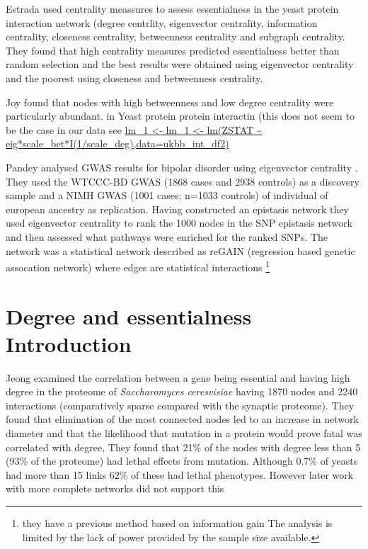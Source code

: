 Estrada \cite{estrada2006virtual} used centrality meassures to assess essentialness in the yeast protein interaction network (degree centrlity, eigenvector centrality, information centrality, closeness centrality, betweenness centrality and subgraph centrality. They found that high centrality measures predicted essentialness better than random selection and  the best results were obtained using eigenvector centrality and the poorest using closeness and betweenness centrality. 

Joy found that nodes with high betweenness and low degree centrality were particularly abundant.\cite{joy2005high} in Yeast protein protein interactin (this does not seem to be the case in our data see \url{lm_1 <- lm_1 <- lm(ZSTAT ~  eig*scale_bet*I(1/scale_deg),data=ukbb_int_df2)}

Pandey analysed GWAS results for bipolar disorder using eigenvector centrality \cite{pandey2012epistasis}. They used the WTCCC-BD GWAS (1868 cases and 2938 controls) as a discovery sample and  a NIMH GWAS (1001 cases; n=1033 controls) of individual of european ancestry as replication. Having constructed an epistasis network they used eigenvector centrality to rank the 1000 nodes in the SNP epistasis network and then assessed what pathways were enriched for the ranked SNPs. The network was a statistical network described as reGAIN (regression based genetic assocation network) where edges are statistical interactions \footnote{they have a previous method based on information gain The analysis is limited by the lack of power provided by the sample size available.}

\section{Degree and essentialness Introduction}
\label{sec:Degree and essentialness}
Jeong \cite{jeong2001lethality} examined the correlation between a gene being essential and having high degree in the proteome of \textit{Saccharomyces ceresvisiae} having 1870 nodes and 2240 interactions (comparatively sparse compared with the synaptic proteome). They found that elimination of the most connected nodes led to an increase in network diameter and that the likelihood that mutation in a protein would prove fatal was correlated with degree, They found that 21\% of the nodes with degree less than 5 (93\% of the proteome) had lethal effects from mutation. Although 0.7\% of yeasts had more than 15 links  62\% of these had lethal phenotypes. However later work with more complete networks did not support this \cite{milenkovic2011dominating} \cite{yu2008high} \cite{ratmann2009evidence}

